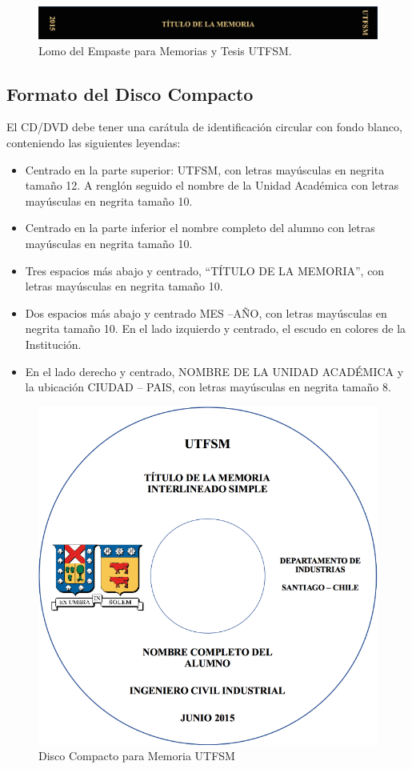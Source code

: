 \begin{figure}[ht!]
\centering
\includegraphics[width=.7\textwidth]{figures/thesis_cover_lateral.png}
\caption{Lomo del Empaste para Memorias y Tesis UTFSM.}
\label{fig:thesis_cover_lateral}
\end{figure}

\subsection{Formato del Disco Compacto}

El CD/DVD debe tener una carátula de identificación circular con fondo blanco, conteniendo las siguientes leyendas:

\begin{itemize}
		\item
    Centrado en la parte superior: UTFSM, con letras mayúsculas en negrita tamaño 12. A renglón seguido el nombre de la Unidad Académica con letras mayúsculas en negrita tamaño 10.
		\item
    Centrado en la parte inferior el nombre completo del alumno con letras mayúsculas en negrita tamaño 10.
		\item
    Tres espacios más abajo y centrado, “TÍTULO DE LA MEMORIA”, con letras mayúsculas en negrita tamaño 10.
		\item
    Dos espacios más abajo y centrado MES –AÑO, con letras mayúsculas en negrita tamaño 10.
    En el lado izquierdo y centrado, el escudo en colores de la Institución.
		\item
    En el lado derecho y centrado, NOMBRE DE LA UNIDAD ACADÉMICA y la ubicación CIUDAD – PAIS, con letras mayúsculas en negrita tamaño 8.
\end{itemize}

\begin{figure}[ht!]
\centering
\includegraphics[width=.4\textwidth]{figures/thesis_cd.png}
\caption{Disco Compacto para Memoria UTFSM}
\label{fig:thesis_cd}
\end{figure}


